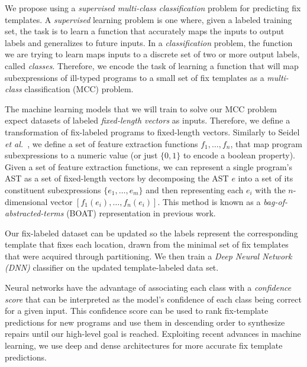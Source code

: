 We propose using a \emph{supervised multi-class classification} problem for
predicting fix templates. A \emph{supervised} learning problem is one where,
given a labeled training set, the task is to learn a function that accurately
maps the inputs to output labels and generalizes to future inputs. In a
\emph{classification} problem, the function we are trying to learn maps inputs
to a discrete set of two or more output labels, called \emph{classes}.
Therefore, we encode the task of learning a function that will map
subexpressions of ill-typed programs to a small set of fix templates as a
\emph{multi-class} classification (MCC) problem.

 The machine learning models that we will train
to solve our MCC problem expect datasets of labeled \emph{fixed-length vectors}
as inputs. Therefore, we define a transformation of fix-labeled programs to
fixed-length vectors. Similarly to Seidel \emph{et al.}~\citep{Seidel:2017}, we define a set of
feature extraction functions $f_1, \ldots, f_n$, that map program subexpressions
to a numeric value (or just $\{0, 1\}$ to encode a boolean property). Given a
set of feature extraction functions, we can represent a single program's AST as
a set of fixed-length vectors by decomposing the AST $e$ into a set of its
constituent subexpressions $\{e_1, \ldots, e_m\}$ and then representing each
$e_i$ with the $n$-dimensional vector $[f_1(e_i), \ldots, f_n(e_i)]$. This
method is known as a \emph{bag-of-abstracted-terms} (BOAT) representation in
previous work. %

Our fix-labeled dataset can be updated so the labels represent the corresponding
template that fixes each location, drawn from the minimal set of fix templates
that were acquired through partitioning. We then train a \emph{Deep Neural
Network (DNN)} classifier on the updated template-labeled data set.

Neural networks have the advantage of associating each class with a
\emph{confidence score} that can be interpreted as the model's confidence of
each class being correct for a given input. This confidence score can be used to
rank fix-template predictions for new programs and use them in descending order
to synthesize repairs until our high-level goal is reached. %
Exploiting recent advances in machine learning, we use deep and dense 
architectures \citep{Schmidhuber_2015} for more accurate fix template predictions.

